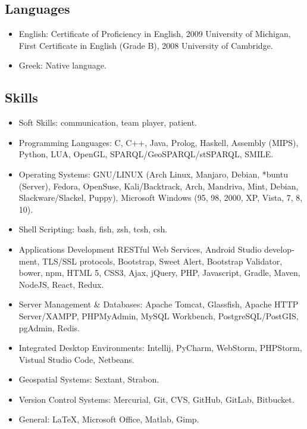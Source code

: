 \documentclass[a4paper,oneside,11pt]{article}
\begin{document}
\subsection*{Languages}

\begin{itemize}

\item English: \textlatin{Certificate of Proficiency in English, 2009 University of Michigan, First Certificate in English (Grade B), 2008 University of Cambridge.}

\item Greek: Native language.

\end{itemize}

\subsection*{Skills}

\begin{itemize}

\item Soft Skills: communication, team player, patient.

\item Programming Languages: \textlatin{C, C++, Java, Prolog, Haskell, Assembly (MIPS), Python, LUA, OpenGL, SPARQL/GeoSPARQL/stSPARQL, SMILE}.

\item Operating Systems: \textlatin{GNU/LINUX (Arch Linux, Manjaro, Debian, *buntu (Server), Fedora, OpenSuse, Kali/Backtrack, Arch, Mandriva, Mint, Debian, Slackware/Slackel, Puppy), Microsoft Windows (95, 98, 2000, XP, Vista, 7, 8, 10)}.

\item Shell Scripting: \textlatin{bash, fish, zsh, tcsh, csh}.

\item Applications Development \textlatin{RESTful Web Services, Android Studio development, TLS/SSL protocols, Bootstrap, Sweet Alert, Bootstrap Validator, bower, npm, HTML 5, CSS3, Ajax, jQuery, PHP, Javascript, Gradle, Maven, NodeJS, React, Redux}.

\item Server Management \& Databases: \textlatin{Apache Tomcat, Glassfish, Apache HTTP Server/XAMPP, PHPMyAdmin, MySQL Workbench, PostgreSQL/PostGIS, pgAdmin, Redis}.

\item Integrated Desktop Environments: \textlatin{Intellij, PyCharm, WebStorm, PHPStorm, Vistual Studio Code, Netbeans}.

\item Geospatial Systems: \textlatin{Sextant, Strabon}.

\item Version Control Systems: \textlatin{Mercurial, Git, CVS, GitHub, GitLab, Bitbucket}.

\item General: \textlatin{\LaTeX, Microsoft Office, Matlab, Gimp}.

\end{itemize}
\end{document}
